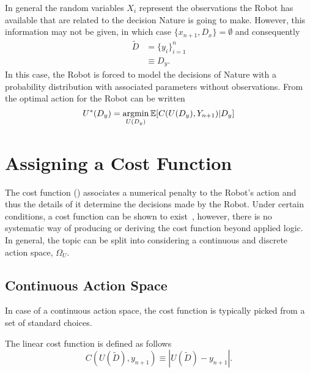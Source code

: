\begin{example}
	In general the random variables $X_i$ represent the observations the Robot has available that are related to the decision Nature is going to make. However, this information may not be given, in which case $\{x_{n+1},D_x\}=\emptyset$ and consequently
	\begin{equation}
		\begin{split}
			\tilde{D} &=\{y_i\}_{i=1}^n\\
			&\equiv D_y.
		\end{split}
	\end{equation}
	In this case, the Robot is forced to model the decisions of Nature with a probability distribution with associated parameters without observations. From  the optimal action for the Robot can be written
	\begin{equation}
		U^*(D_y) = \operatorname*{argmin}_{U(D_y)} \mathbb{E}[C(U(D_y), Y_{n+1})|D_y]
		\label{eq:best_decision1}
	\end{equation}
\end{example}

\section{Assigning a Cost Function}
\label{sec:assing_cost}
The cost function () associates a numerical penalty to the Robot's action and thus the details of it determine the decisions made by the Robot. Under certain conditions, a cost function can be shown to exist~\cite{lavalle2006planning}, however, there is no systematic way of producing or deriving the cost function beyond applied logic. In general, the topic can be split into considering a continuous and discrete action space, $\Omega_U$. 	

\subsection{Continuous Action Space}
In case of a continuous action space, the cost function is typically picked from a set of standard choices.	
\begin{definition}
	\label{def:linear_cost_function}
	The linear cost function is defined as follows
	\begin{equation}
		C(U(\tilde{D}),y_{n+1}) \equiv |U(\tilde{D})-y_{n+1}|.
	\end{equation}	
\end{definition}

